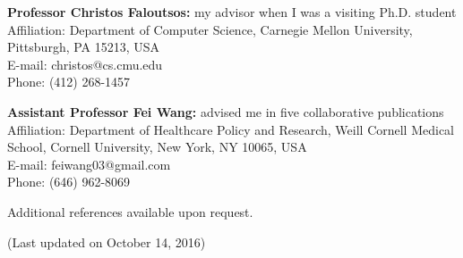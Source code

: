 \documentclass[margin, 10pt]{res}
\begin{document}
\begin{resume}
\textbf{Professor Christos Faloutsos:} my advisor when I was a visiting Ph.D. student \\
{Affiliation}: {Department of Computer Science, Carnegie Mellon University, Pittsburgh, PA 15213, USA} \\
{E-mail:} {christos@cs.cmu.edu} \\
{Phone:} {(412) 268-1457}

\textbf{Assistant Professor Fei Wang:} advised me in five collaborative publications \\
{Affiliation}: {Department of Healthcare Policy and Research, Weill Cornell Medical School, Cornell University, New York, NY 10065, USA} \\
{E-mail:} {feiwang03@gmail.com} \\
{Phone:} {(646) 962-8069}

Additional references available upon request.

(Last updated on October 14, 2016)
\end{resume}
\end{document}

